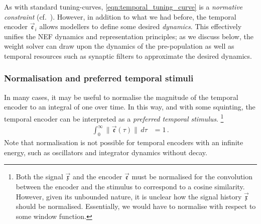 As with standard tuning-curves, \cref{eqn:temporal_tuning_curve} is a \emph{normative constraint} (cf.~).
However, in addition to what we had before, the temporal encoder $\vec{\mathfrak{e}}_i$ allows modellers to define some desired \emph{dynamics}.
This effectively unifies the NEF dynamics and representation principles; as we discuss below, the weight solver can draw upon the dynamics of the pre-population as well as temporal resources such as synaptic filters to approximate the desired dynamics.

\subsubsection{Normalisation and preferred temporal stimuli}
In many cases, it may be useful to normalise the magnitude of the temporal encoder to an integral of one over time.
In this way, and with some squinting, the temporal encoder can be interpreted as a \emph{preferred temporal stimulus}.%
\footnote{Both the signal $\vec{\mathfrak{x}}$ and the encoder $\vec{\mathfrak{e}}$ must be normalised for the convolution between the encoder and the stimulus to correspond to a cosine similarity.
However, given its unbounded nature, it is unclear how the signal history $\vec{\mathfrak{x}}$ should be normalised.
Essentially, we would have to normalise with respect to some window function.}
\begin{align}
	\int_{0}^\infty \| \vec{\mathfrak{e}}(\tau) \| \,\mathit{d\tau}&= 1 \,.
	\label{eqn:normalisation}
\end{align}
Note that normalisation is not possible for temporal encoders with an infinite energy, such as oscillators and integrator dynamics without decay.

